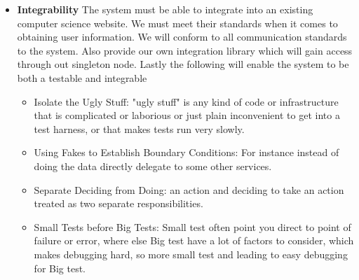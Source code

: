 \begin{itemize}
	\item \textbf{Integrability}
		The system must be able to integrate into an existing computer science website. We must meet their standards when it comes to obtaining user information. We will conform to all communication standards to the system. Also provide our own integration library which will gain access through out singleton node. Lastly the following will enable the system to be both a testable and integrable
		\begin{itemize}
			\item Isolate the Ugly Stuff: "ugly stuff" is any kind of code or infrastructure that is complicated or laborious or just plain inconvenient to get into a test harness, or that makes tests run very slowly.
			\item Using Fakes to Establish Boundary Conditions: For instance instead of doing the data directly delegate to some other services.
			\item Separate Deciding from Doing: an action and deciding to take an action treated as two separate responsibilities.
			\item Small Tests before Big Tests: Small test often point you direct to point of failure or error, where else Big test have a lot of factors to consider, which makes debugging hard, so more small test and leading to easy debugging for Big test.

		\end{itemize} 
\end{itemize}

%